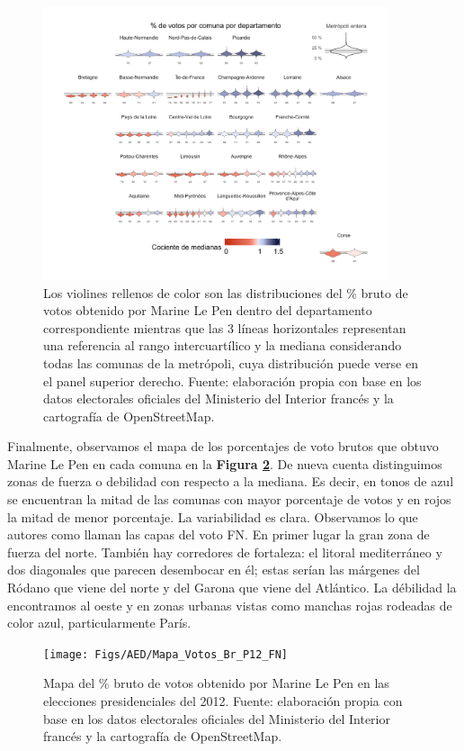 \begin{figure}[H]
	\centering
	\includegraphics[width = 0.9\textwidth]{Figs/AED/Geofacet_Dpto_P12_FN}
	\caption{Los violines rellenos de color son las distribuciones del \% bruto de votos obtenido por Marine Le Pen dentro del departamento correspondiente mientras que las 3 líneas horizontales representan una referencia al rango intercuartílico y la mediana considerando todas las comunas de la metrópoli, cuya distribución puede verse en el panel superior derecho. Fuente: elaboración propia con base en los datos electorales oficiales del Ministerio del Interior francés y la cartografía de OpenStreetMap.}
	\label{fig:Geofacet_Distr_Dptos_P12}	
\end{figure}

Finalmente, observamos el mapa de los porcentajes de voto brutos que obtuvo Marine Le Pen en cada comuna en la \textbf{Figura \ref{fig:Mapa_Pct_Br}}. De nueva cuenta distinguimos zonas de fuerza o debilidad con respecto a la mediana. Es decir, en tonos de azul se encuentran la mitad de las comunas con mayor porcentaje de votos y en rojos la mitad de menor porcentaje. La variabilidad es clara. Observamos lo que autores como \textcite{LeBras15} llaman las capas del voto FN. En primer lugar la gran zona de fuerza del norte. También hay corredores de fortaleza: el litoral mediterráneo y dos diagonales que parecen desembocar en él; estas serían las márgenes del Ródano que viene del norte y del Garona que viene del Atlántico. La débilidad la encontramos al oeste y en zonas urbanas vistas como manchas rojas rodeadas de color azul, particularmente París.

\begin{figure}[h]
	\centering
	\texttt{[image: Figs/AED/Mapa\_Votos\_Br\_P12\_FN]}
	\caption{Mapa del \% bruto de votos obtenido por Marine Le Pen en las elecciones presidenciales del 2012. Fuente: elaboración propia con base en los datos electorales oficiales del Ministerio del Interior francés y la cartografía de OpenStreetMap.}
	\label{fig:Mapa_Pct_Br}	
\end{figure}

